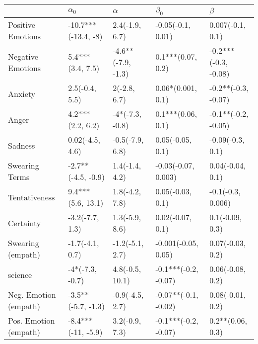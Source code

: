 \begin{tabular}{lllll}
\toprule
{} &           $\alpha_0$ &            $\alpha$ &             $\beta_0$ &               $\beta$ \\
\midrule
Positive Emotions     &  -10.7***(-13.4, -8) &      2.4(-1.9, 6.7) &     -0.05(-0.1, 0.01) &      0.007(-0.1, 0.1) \\
Negative Emotions     &     5.4***(3.4, 7.5) &  -4.6**(-7.9, -1.3) &     0.1***(0.07, 0.2) &  -0.2***(-0.3, -0.08) \\
Anxiety               &       2.5(-0.4, 5.5) &        2(-2.8, 6.7) &     0.06*(0.001, 0.1) &   -0.2**(-0.3, -0.07) \\
Anger                 &     4.2***(2.2, 6.2) &     -4*(-7.3, -0.8) &     0.1***(0.06, 0.1) &   -0.1**(-0.2, -0.05) \\
Sadness               &      0.02(-4.5, 4.6) &     -0.5(-7.9, 6.8) &      0.05(-0.05, 0.1) &      -0.09(-0.3, 0.1) \\
Swearing Terms        &   -2.7**(-4.5, -0.9) &      1.4(-1.4, 4.2) &   -0.03(-0.07, 0.003) &      0.04(-0.04, 0.1) \\
Tentativeness         &    9.4***(5.6, 13.1) &      1.8(-4.2, 7.8) &      0.05(-0.03, 0.1) &     -0.1(-0.3, 0.006) \\
Certainty             &      -3.2(-7.7, 1.3) &      1.3(-5.9, 8.6) &      0.02(-0.07, 0.1) &       0.1(-0.09, 0.3) \\
Swearing (empath)     &      -1.7(-4.1, 0.7) &     -1.2(-5.1, 2.7) &   -0.001(-0.05, 0.05) &      0.07(-0.03, 0.2) \\
science               &      -4*(-7.3, -0.7) &     4.8(-0.5, 10.1) &  -0.1***(-0.2, -0.07) &      0.06(-0.08, 0.2) \\
Neg. Emotion (empath) &   -3.5**(-5.7, -1.3) &     -0.9(-4.5, 2.7) &  -0.07**(-0.1, -0.02) &      0.08(-0.01, 0.2) \\
Pos. Emotion (empath) &   -8.4***(-11, -5.9) &      3.2(-0.9, 7.3) &  -0.1***(-0.2, -0.07) &      0.2**(0.06, 0.3) \\
\bottomrule
\end{tabular}
